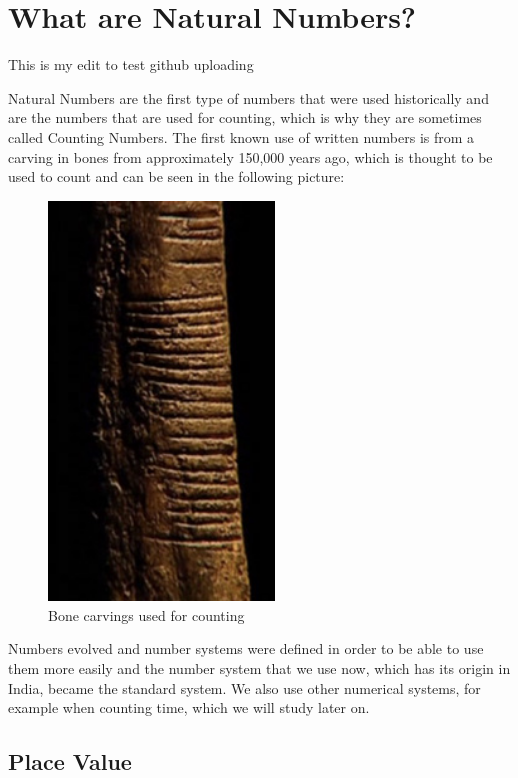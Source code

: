 \documentclass[11pt, oneside]{article}
\theoremstyle{definition}
\begin{document}
\section{What are Natural Numbers?}

This is my edit to test github uploading

Natural Numbers are the first type of numbers that were used historically and are the numbers that are used for counting, which is why they are sometimes called Counting Numbers. The first known use of written numbers is from a carving in bones from approximately 150,000 years ago, which is thought to be used to count and can be seen in the following picture:

\begin{figure}[ht!]
\centering
\includegraphics[width=60mm]{bone-carving.jpg}
\caption{Bone carvings used for counting \label{overflow}}
\end{figure}

Numbers evolved and number systems were defined in order to be able to use them more easily and the number system that we use now, which has its origin in India, became the standard system. We also use other numerical systems, for example when counting time, which we will study later on. 

\subsection{Place Value}
\end{document}
